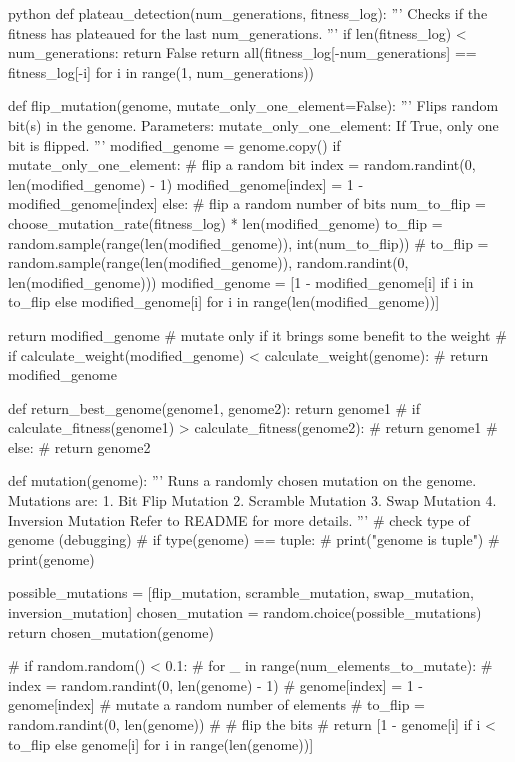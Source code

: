 \begin{mintedbox}{python}
def plateau_detection(num_generations, fitness_log):
    '''
    Checks if the fitness has plateaued for the last num_generations.
    '''
    if len(fitness_log) < num_generations:
        return False
    return all(fitness_log[-num_generations] == fitness_log[-i] for i in range(1, num_generations))

def flip_mutation(genome, mutate_only_one_element=False):
    '''
    Flips random bit(s) in the genome.
    Parameters:
    mutate_only_one_element: If True, only one bit is flipped.
    '''
    modified_genome = genome.copy()
    if mutate_only_one_element:
        # flip a random bit
        index = random.randint(0, len(modified_genome) - 1)
        modified_genome[index] = 1 - modified_genome[index]
    else:
        # flip a random number of bits
        num_to_flip = choose_mutation_rate(fitness_log) * len(modified_genome)
        to_flip = random.sample(range(len(modified_genome)), int(num_to_flip))
        # to_flip = random.sample(range(len(modified_genome)), random.randint(0, len(modified_genome)))
        modified_genome = [1 - modified_genome[i] if i in to_flip else modified_genome[i] for i in range(len(modified_genome))]

    return modified_genome
    # mutate only if it brings some benefit to the weight
    # if calculate_weight(modified_genome) < calculate_weight(genome):
    #     return modified_genome


def return_best_genome(genome1, genome2):
    return genome1
    # if calculate_fitness(genome1) > calculate_fitness(genome2):
    #     return genome1
    # else:
    #     return genome2

def mutation(genome):
    '''
    Runs a randomly chosen mutation on the genome. Mutations are:
    1. Bit Flip Mutation
    2. Scramble Mutation
    3. Swap Mutation
    4. Inversion Mutation
    Refer to README for more details.
    '''
    # check type of genome (debugging)
    # if type(genome) == tuple:
    #     print("genome is tuple")
    #     print(genome)

    possible_mutations = [flip_mutation, scramble_mutation, swap_mutation, inversion_mutation]
    chosen_mutation = random.choice(possible_mutations)
    return chosen_mutation(genome)

    # if random.random() < 0.1:
    #     for _ in range(num_elements_to_mutate):
    #         index = random.randint(0, len(genome) - 1)
    #         genome[index] = 1 - genome[index]
    # mutate a random number of elements
    # to_flip = random.randint(0, len(genome))
    # # flip the bits
    # return [1 - genome[i] if i < to_flip else genome[i] for i in range(len(genome))]


\end{mintedbox}
